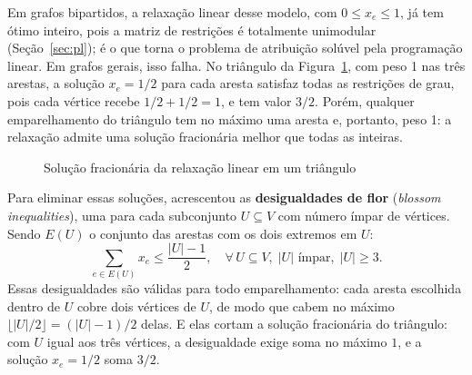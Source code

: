 Em grafos bipartidos, a relaxação linear desse modelo, com $0 \le x_e \le 1$, já tem ótimo inteiro, pois a matriz de restrições é totalmente unimodular (Seção~\ref{sec:pl}); é o que torna o problema de atribuição solúvel pela programação linear. Em grafos gerais, isso falha. No triângulo da Figura~\ref{fig:triangulo}, com peso 1 nas três arestas, a solução $x_e = 1/2$ para cada aresta satisfaz todas as restrições de grau, pois cada vértice recebe $1/2 + 1/2 = 1$, e tem valor $3/2$. Porém, qualquer emparelhamento do triângulo tem no máximo uma aresta e, portanto, peso 1: a relaxação admite uma solução fracionária melhor que todas as inteiras.

\begin{figure}[H]
    \centering
    \caption{Solução fracionária da relaxação linear em um triângulo}
    \label{fig:triangulo}
\end{figure}

Para eliminar essas soluções,  acrescentou as \textbf{desigualdades de flor} (\textit{blossom inequalities}), uma para cada subconjunto $U \subseteq V$ com número ímpar de vértices. Sendo $E(U)$ o conjunto das arestas com os dois extremos em $U$:
\begin{equation}
    \sum_{e \in E(U)} x_e \le \frac{|U| - 1}{2}, \quad \forall\, U \subseteq V, \; |U| \text{ ímpar}, \; |U| \ge 3.
    \label{eq:desig_flor}
\end{equation}
Essas desigualdades são válidas para todo emparelhamento: cada aresta escolhida dentro de $U$ cobre dois vértices de $U$, de modo que cabem no máximo $\lfloor |U|/2 \rfloor = (|U| - 1)/2$ delas. E elas cortam a solução fracionária do triângulo: com $U$ igual aos três vértices, a desigualdade exige soma no máximo $1$, e a solução $x_e = 1/2$ soma $3/2$.


